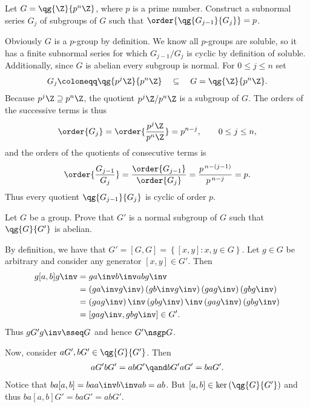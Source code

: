 \documentclass{article}
\begin{document}
\setcounter{section}{11} %
\begin{exercise} \label{qs:11-1} %
Let \( G = \qg{\Z}{p^n\Z} \), where \( p \) is a prime number.
Construct a subnormal series \( G_j \) of subgroups of \( G \) such that \( \order{\qg{G_{j-1}}{G_j}}=p \).
\end{exercise}
\begin{solution}
Obviously \( G \) is a \( p \)-group by definition.
We know all \( p \)-groups are soluble, so it has a finite subnormal series for which \( G_{j-1}/G_j \) is cyclic by definition of soluble.
Additionally, since \( G \) is abelian every subgroup is normal.
For \( 0 \le j \le n \) set
\begin{align*}
  G_j \coloneqq \qg{p^{j} \Z}{p^{n} \Z}
  \quad\subseteq\quad
  G = \qg{\Z}{p^n\Z}.
\end{align*}
Because \( p^{j} \Z \supseteq p^{n} \Z \), the quotient \( p^{j}\Z / p^{n}\Z \) is a subgroup of \( G \).
The orders of the successive terms is thus
\begin{align*}
  \order{G_j} = \order{\frac{p^{j} \Z}{p^{n} \Z}} = p^{n-j}, \qquad 0 \le j \le n,
\end{align*}
and the orders of the quotients of consecutive terms is
\begin{align*}
  \order{\frac{G_{j-1}}{G_j}} = \frac{\order{G_{j-1}}}{\order{G_j}} = \frac{p^{\,n-(j-1)}}{p^{\,n-j}} = p .
\end{align*}
Thus every quotient \( \qg{G_{j-1}}{G_j} \) is cyclic of order \( p \).
\end{solution}

\begin{subexercise}
  Let \( G \) be a group.
  Prove that \( G' \) is a normal subgroup of \( G \) such that \( \qg{G}{G'} \) is abelian.
\end{subexercise}
\begin{solution}
By definition, we have that \( G' = [G,G] = \left\{ [x,y] : x,y\in G \right\} \).
Let \( g\in G \) be arbitrary and consider any generator \( [x,y]\in G' \).
Then \begin{align*}
  g[a,b]g\inv &= ga\inv b\inv ab g\inv \\
  &= \left(ga\inv g\inv\right)\left(gb\inv g\inv\right)\left(gag\inv\right)\left(gbg\inv\right) \\
  &= \left(gag\inv\right)\inv\left(gbg\inv\right)\inv \left(gag\inv\right)\left(gbg\inv\right) \\
  &= [gag\inv, gbg\inv]\in G'.
\end{align*}
Thus \( gG' g\inv \sseq G \) and hence \( G' \nsgp G \).

Now, consider \( a G', b G' \in \qg{G}{G'} \).
Then \begin{align*}
  a G' b G' = ab G' \qand bG'aG' = baG'.
\end{align*}
Notice that \( ba[a,b] = baa\inv b\inv ab = ab \).
But \( [a,b]\in \ker \left( \qg{G}{G'} \right) \) and thus \( ba[a,b]G' = baG' = ab G' \).
\end{solution}
\end{document}
